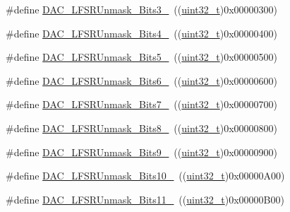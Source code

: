 \begin{DoxyCompactItemize}
\item 
\#define \hyperlink{group___d_a_c__lfsrunmask__triangleamplitude_gafe219362b3a48d8678a65ef38cb45532}{D\+A\+C\+\_\+\+L\+F\+S\+R\+Unmask\+\_\+\+Bits3\+\_}~((\hyperlink{_p_e___types_8h_a33594304e786b158f3fb30289278f5af}{uint32\+\_\+t})0x00000300)
\item 
\#define \hyperlink{group___d_a_c__lfsrunmask__triangleamplitude_ga2543d802e19d592a26c8231be663cdac}{D\+A\+C\+\_\+\+L\+F\+S\+R\+Unmask\+\_\+\+Bits4\+\_}~((\hyperlink{_p_e___types_8h_a33594304e786b158f3fb30289278f5af}{uint32\+\_\+t})0x00000400)
\item 
\#define \hyperlink{group___d_a_c__lfsrunmask__triangleamplitude_ga71a01660d410823bfe76a603080dc125}{D\+A\+C\+\_\+\+L\+F\+S\+R\+Unmask\+\_\+\+Bits5\+\_}~((\hyperlink{_p_e___types_8h_a33594304e786b158f3fb30289278f5af}{uint32\+\_\+t})0x00000500)
\item 
\#define \hyperlink{group___d_a_c__lfsrunmask__triangleamplitude_ga48fe2d3f4274d6bf28e446ca0001ed5d}{D\+A\+C\+\_\+\+L\+F\+S\+R\+Unmask\+\_\+\+Bits6\+\_}~((\hyperlink{_p_e___types_8h_a33594304e786b158f3fb30289278f5af}{uint32\+\_\+t})0x00000600)
\item 
\#define \hyperlink{group___d_a_c__lfsrunmask__triangleamplitude_gaf0a93c1ee1e13776fae7558b36243431}{D\+A\+C\+\_\+\+L\+F\+S\+R\+Unmask\+\_\+\+Bits7\+\_}~((\hyperlink{_p_e___types_8h_a33594304e786b158f3fb30289278f5af}{uint32\+\_\+t})0x00000700)
\item 
\#define \hyperlink{group___d_a_c__lfsrunmask__triangleamplitude_ga4f56965841d9d91ca5b6de43ee589598}{D\+A\+C\+\_\+\+L\+F\+S\+R\+Unmask\+\_\+\+Bits8\+\_}~((\hyperlink{_p_e___types_8h_a33594304e786b158f3fb30289278f5af}{uint32\+\_\+t})0x00000800)
\item 
\#define \hyperlink{group___d_a_c__lfsrunmask__triangleamplitude_gaf7f4540d9ec6efe074e1e4485f9a347a}{D\+A\+C\+\_\+\+L\+F\+S\+R\+Unmask\+\_\+\+Bits9\+\_}~((\hyperlink{_p_e___types_8h_a33594304e786b158f3fb30289278f5af}{uint32\+\_\+t})0x00000900)
\item 
\#define \hyperlink{group___d_a_c__lfsrunmask__triangleamplitude_ga7670f0e10f062571d0e56027ef653228}{D\+A\+C\+\_\+\+L\+F\+S\+R\+Unmask\+\_\+\+Bits10\+\_}~((\hyperlink{_p_e___types_8h_a33594304e786b158f3fb30289278f5af}{uint32\+\_\+t})0x00000\+A00)
\item 
\#define \hyperlink{group___d_a_c__lfsrunmask__triangleamplitude_gaeb9b5992b771f9a14587eeda58227831}{D\+A\+C\+\_\+\+L\+F\+S\+R\+Unmask\+\_\+\+Bits11\+\_}~((\hyperlink{_p_e___types_8h_a33594304e786b158f3fb30289278f5af}{uint32\+\_\+t})0x00000\+B00)

\end{DoxyCompactItemize}
